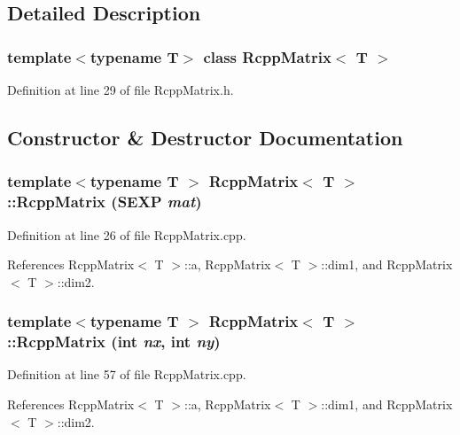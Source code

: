 \subsection{Detailed Description}
\subsubsection*{template$<$typename T$>$ class RcppMatrix$<$ T $>$}



Definition at line 29 of file RcppMatrix.h.

\subsection{Constructor \& Destructor Documentation}
\hypertarget{classRcppMatrix_a6cdd09180c21b504d1455ae2bc8939a7}{
\subsubsection[{RcppMatrix}]{\setlength{\rightskip}{0pt plus 5cm}template$<$typename T $>$ {\bf RcppMatrix}$<$ T $>$::{\bf RcppMatrix} (SEXP {\em mat})}}
\label{classRcppMatrix_a6cdd09180c21b504d1455ae2bc8939a7}


Definition at line 26 of file RcppMatrix.cpp.

References RcppMatrix$<$ T $>$::a, RcppMatrix$<$ T $>$::dim1, and RcppMatrix$<$ T $>$::dim2.\hypertarget{classRcppMatrix_a9ac16e2fcccd2a21a33097139e4ec253}{
\subsubsection[{RcppMatrix}]{\setlength{\rightskip}{0pt plus 5cm}template$<$typename T $>$ {\bf RcppMatrix}$<$ T $>$::{\bf RcppMatrix} (int {\em nx}, \/  int {\em ny})}}
\label{classRcppMatrix_a9ac16e2fcccd2a21a33097139e4ec253}


Definition at line 57 of file RcppMatrix.cpp.

References RcppMatrix$<$ T $>$::a, RcppMatrix$<$ T $>$::dim1, and RcppMatrix$<$ T $>$::dim2.

